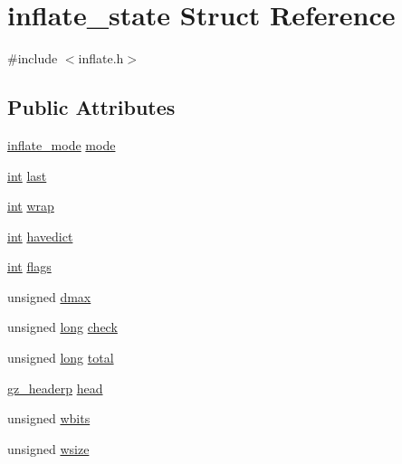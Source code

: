 \hypertarget{structinflate__state}{\section{inflate\-\_\-state Struct Reference}
\label{structinflate__state}
}


{\ttfamily \#include $<$inflate.\-h$>$}

\subsection*{Public Attributes}
\begin{DoxyCompactItemize}
\item 
\hyperlink{inflate_8h_a164ea0159d5f0b5f12a646f25f99ecea}{inflate\-\_\-mode} \hyperlink{structinflate__state_a9c7906fee7eeeb450b13576531ca639d}{mode}
\item 
\hyperlink{ioapi_8h_a787fa3cf048117ba7123753c1e74fcd6}{int} \hyperlink{structinflate__state_ab3cbcd2c5ff3b0b8b34ef402a13afdf7}{last}
\item 
\hyperlink{ioapi_8h_a787fa3cf048117ba7123753c1e74fcd6}{int} \hyperlink{structinflate__state_a990d157b5c0d4ba178c3361de9ce6561}{wrap}
\item 
\hyperlink{ioapi_8h_a787fa3cf048117ba7123753c1e74fcd6}{int} \hyperlink{structinflate__state_a2eb1cd634ed6baade952ffa5938ebcdc}{havedict}
\item 
\hyperlink{ioapi_8h_a787fa3cf048117ba7123753c1e74fcd6}{int} \hyperlink{structinflate__state_a9dcf6151443750d75b2283d0a3e62c39}{flags}
\item 
unsigned \hyperlink{structinflate__state_ae3d433011714e673b22e82156acc4416}{dmax}
\item 
unsigned \hyperlink{ioapi_8h_a3c7b35ad9dab18b8310343c201f7b27e}{long} \hyperlink{structinflate__state_ae597e4f5c37b9f7881015384bf826371}{check}
\item 
unsigned \hyperlink{ioapi_8h_a3c7b35ad9dab18b8310343c201f7b27e}{long} \hyperlink{structinflate__state_af9d1071eb75b1ee37a151ccec8dfee95}{total}
\item 
\hyperlink{zlib_8h_a40e9dcc294796d99b25e98fb06477fc8}{gz\-\_\-headerp} \hyperlink{structinflate__state_aac35b33a559009eb4bc0e2bdd8e9b5c6}{head}
\item 
unsigned \hyperlink{structinflate__state_a71f844b589ac450f17d69f3692a8c5cc}{wbits}
\item 
unsigned \hyperlink{structinflate__state_acca16ca86216760eaf307bf71e15e470}{wsize}
\item 

\end{DoxyCompactItemize}
